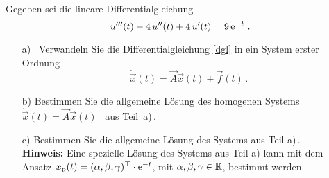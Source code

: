 {
Gegeben sei die lineare Differentialgleichung
\renewcommand{\theequation}{\arabic{Blatt}.\arabic{equation}}
\begin{equation}
\label{dgl}
	u'''(t) - 4\,u''(t)+4\,u'(t) = 9\,\mathrm{e}^{-t}\ .
\end{equation}
\begin{itemize}
 \item[a)] \ Verwandeln Sie die Differentialgleichung \eqref{dgl} in ein System erster Ordnung
\[
\dot{{\vec x}}(t) = \vec A \vec x(t) + \vec f(t) \,. 
\]
\item[b)]  Bestimmen Sie die allgemeine L\"osung des homogenen Systems \ $\dot{{\vec x}}(t) = \vec A \vec x(t) $ \  aus \mbox{Teil a)}\,.
\item[c)]  Bestimmen Sie die allgemeine L\"osung des Systems aus Teil a)\,. \\[1ex]
\textbf{Hinweis:} Eine spezielle L\"osung des Systems aus Teil a) kann mit dem Ansatz $\boldsymbol x_{\mathrm{p}}(t) = (\alpha,\beta,\gamma)^\top \cdot\mathrm{e}^{-t}$, mit $\alpha,\beta,\gamma\in \mathbb{R}$,  bestimmt werden. 
\end{itemize}

}

